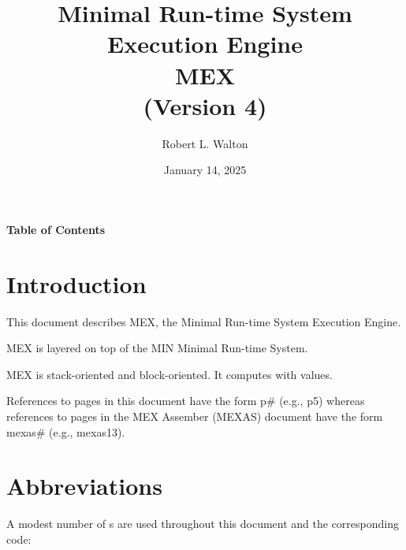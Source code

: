 \documentclass[12pt]{article}
\begin{document}
        
\title{Minimal Run-time System\\[2ex]Execution Engine\\[2ex]MEX\\[2ex]
       (Version 4)}

\author{Robert L. Walton}

\date{January 14, 2025}
 
\maketitle

\begin{center}
\large \bf Table of Contents
\end{center}

\bigskip

\tableofcontents 

\newpage

\section{Introduction}

This document describes MEX,
the Minimal Run-time System Execution Engine.

MEX is layered on top of the MIN Minimal Run-time System.

MEX is stack-oriented and block-oriented.  It computes with
 values.

References to pages in this document have the form p\# (e.g., p5)
whereas references to pages in the MEX Assember (MEXAS) document have the
form mexas\# (e.g., mexas13).

\section{Abbreviations}
\label{ABBREVIATIONS}

A modest number of s are used throughout this document
and the corresponding code:
\end{document}
